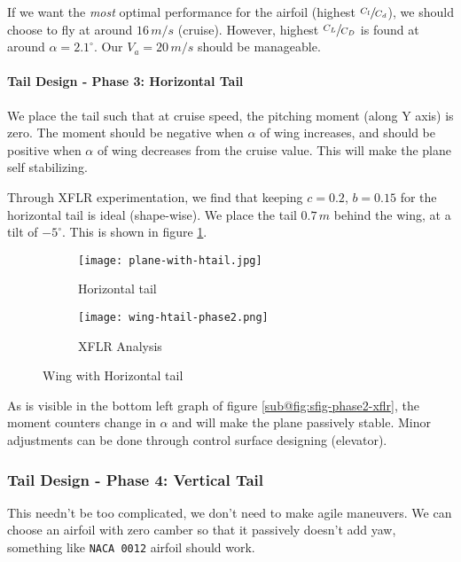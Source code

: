 If we want the \emph{most} optimal performance for the airfoil (highest $\sfrac{C_l}{C_d}$), we should choose to fly at around $16\,m/s$ (cruise). However, highest $\sfrac{C_L}{C_D}$ is found at around $\alpha = 2.1^\circ$. Our $V_a = 20\,m/s$ should be manageable.

\paragraph*{Tail Design - Phase 3: Horizontal Tail}

We place the tail such that at cruise speed, the pitching moment (along Y axis) is zero. The moment should be negative when $\alpha$ of wing increases, and should be positive when $\alpha$ of wing decreases from the cruise value. This will make the plane self stabilizing.

Through XFLR experimentation, we find that keeping $c = 0.2$, $b = 0.15$ for the horizontal tail is ideal (shape-wise). We place the tail $0.7\,m$ behind the wing, at a tilt of $-5^\circ$. This is shown in figure \ref{fig:sfig-wing-htail}.

\begin{figure}[ht]
    \centering
    \begin{subfigure}[b]{0.4\textwidth}
        \texttt{[image: plane-with-htail.jpg]}
        \caption{Horizontal tail}
        \label{fig:sfig-wing-htail}
    \end{subfigure}
    \begin{subfigure}[b]{0.4\textwidth}
        \texttt{[image: wing-htail-phase2.png]}
        \caption{XFLR Analysis}
        \label{fig:sfig-phase2-xflr}
    \end{subfigure}
    \caption{Wing with Horizontal tail}
\end{figure}

As is visible in the bottom left graph of figure \ref{sub@fig:sfig-phase2-xflr}, the moment counters change in $\alpha$ and will make the plane passively stable. Minor adjustments can be done through control surface designing (elevator).

\subsubsection*{Tail Design - Phase 4: Vertical Tail}

This needn't be too complicated, we don't need to make agile maneuvers. We can choose an airfoil with zero camber so that it passively doesn't add yaw, something like \texttt{NACA 0012} airfoil should work.

